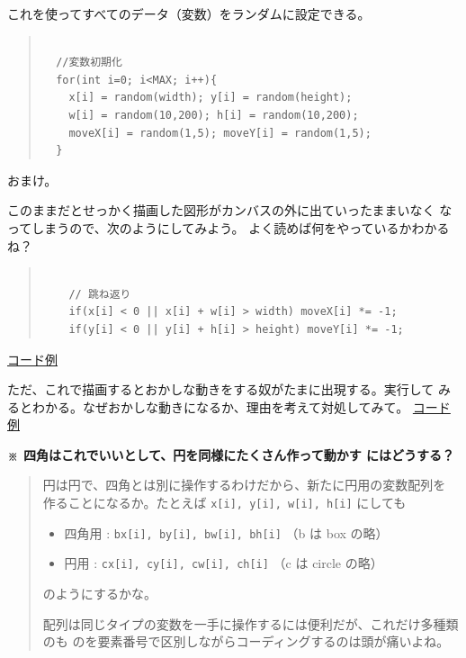 \documentclass[uplatex,a4j,11pt]{jsarticle}
\renewcommand{\baselinestretch}{1.08}
\begin{document}
    これを使ってすべてのデータ（変数）をランダムに設定できる。

    \begin{quote}
	\begin{minipage}{\linewidth}
	 \begin{shadebox}
      \def\baselinestretch{.8}\selectfont
      \small
      \begin{verbatim}

  //変数初期化
  for(int i=0; i<MAX; i++){
    x[i] = random(width); y[i] = random(height);
    w[i] = random(10,200); h[i] = random(10,200);
    moveX[i] = random(1,5); moveY[i] = random(1,5);
  }
      \end{verbatim}
	 \end{shadebox} 
	 \end{minipage}
	\end{quote}

    おまけ。

    このままだとせっかく描画した図形がカンバスの外に出ていったままいなく
    なってしまうので、次のようにしてみよう。
    よく読めば何をやっているかわかるね？
    
    \begin{quote}
	\begin{minipage}{\linewidth}
	 \begin{shadebox}
      \def\baselinestretch{.8}\selectfont
      \small
      \begin{verbatim}

    // 跳ね返り
    if(x[i] < 0 || x[i] + w[i] > width) moveX[i] *= -1;
    if(y[i] < 0 || y[i] + h[i] > height) moveY[i] *= -1;
      \end{verbatim}
	 \end{shadebox} 
	 \end{minipage}
	\end{quote}

\href{prim020.txt}{コード例}

    ただ、これで描画するとおかしな動きをする奴がたまに出現する。実行して
    みるとわかる。なぜおかしな動きになるか、理由を考えて対処してみて。
\href{prim02.txt}{コード例}

\medskip
{\bfseries ※ 四角はこれでいいとして、円を同様にたくさん作って動かす
にはどうする？}

\begin{quote}
 円は円で、四角とは別に操作するわけだから、新たに円用の変数配列を
 作ることになるか。たとえば \verb|x[i], y[i], w[i], h[i]| にしても
\begin{itemize}
 \item 四角用 : \verb|bx[i], by[i], bw[i], bh[i]| （b は box の略）
 \item 円用 : \verb|cx[i], cy[i], cw[i], ch[i]| （c は circle の略）
\end{itemize}
のようにするかな。

 配列は同じタイプの変数を一手に操作するには便利だが、これだけ多種類のも
 のを要素番号で区別しながらコーディングするのは頭が痛いよね。

\end{quote}
\end{document}
